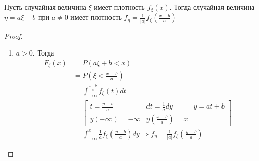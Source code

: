 \begin{theorem}
    Пусть случайная величина \(\xi\) имеет плотность \(f_\xi(x)\). Тогда случайная величина \(\eta = a\xi + b\) при \(a \neq 0\) имеет плотность \(f_\eta = \frac{1}{|a|} f_\xi\left( \frac{x - b}{a} \right)\)
\end{theorem}
\begin{proof}\itemfix
    \begin{enumerate}
        \item \(a > 0\). Тогда
              \begin{align*}
                  F_\xi(x) & = P(a\xi + b < x)                                                                                                                               \\
                           & = P\left( \xi < \frac{x - b}{a} \right)                                                                                                         \\
                           & = \int_{ -\infty}^{\frac{x - b}{a}} f_\xi(t) dt                                                                                                 \\
                           & = \begin{bmatrix}
                      t = \frac{y - b}{a}   & dt = \frac{1}{a}dy                  & y = at + b \\
                      y( -\infty) = -\infty & y\left( \frac{x - b}{a} \right) = x
                  \end{bmatrix}                                                                                                                    \\
                           & = \int_{ -\infty}^{x} \frac{1}{a} f_\xi\left( \frac{y - b}{a} \right) dy \Rightarrow f_\eta = \frac{1}{|a|} f_\xi\left( \frac{y - b}{a} \right)
              \end{align*}


\end{enumerate}
\end{proof}
